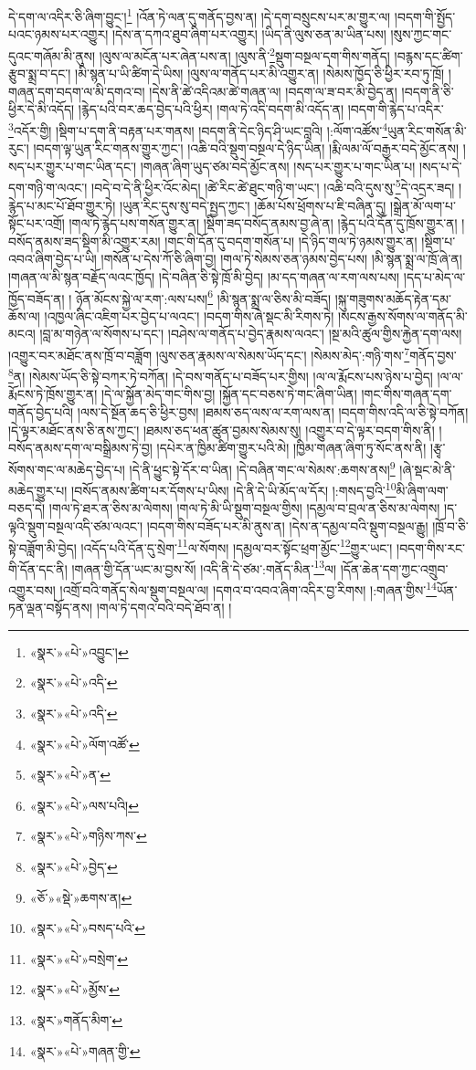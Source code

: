 དེ་དག་ལ་འདིར་ཅི་ཞིག་བྱུང་།\footnote{«སྣར་»«པེ་»འབྱུང་།} །འོན་ཏེ་ལན་དུ་གནོད་བྱས་ན། །དེ་དག་བསྲུངས་པར་མ་གྱུར་ལ། །བདག་གི་སྤྱོད་པའང་ཉམས་པར་འགྱུར། །དེས་ན་དཀའ་ཐུབ་ཞིག་པར་འགྱུར། །ཡིད་ནི་ལུས་ཅན་མ་ཡིན་པས། །སུས་ཀྱང་གང་དུའང་གཞོམ་མི་ནུས། །ལུས་ལ་མངོན་པར་ཞེན་པས་ན། །ལུས་ནི་\footnote{«སྣར་»«པེ་»འདི་}སྡུག་བསྔལ་དག་གིས་གནོད། །བརྙས་དང་ཚིག་རྩུབ་སྨྲ་བ་དང་། །མི་སྙན་པ་ཡི་ཚིག་དེ་ཡིས། །ལུས་ལ་གནོད་པར་མི་འགྱུར་ན། །སེམས་ཁྱོད་ཅི་ཕྱིར་རབ་ཏུ་ཁྲོ། །གཞན་དག་བདག་ལ་མི་དགའ་བ། །དེས་ནི་ཚེ་འདིའམ་ཚེ་གཞན་ལ། །བདག་ལ་ཟ་བར་མི་བྱེད་ན། །བདག་ནི་ཅི་ཕྱིར་དེ་མི་འདོད། །རྙེད་པའི་བར་ཆད་བྱེད་པའི་ཕྱིར། །གལ་ཏེ་འདི་བདག་མི་འདོད་ན། །བདག་གི་རྙེད་པ་འདིར་\footnote{«སྣར་»«པེ་»འདི་}འདོར་གྱི། །སྡིག་པ་དག་ནི་བརྟན་པར་གནས། །བདག་ནི་དེང་ཉིད་ཤི་ཡང་བླའི། །:ལོག་འཚོས་\footnote{«སྣར་»«པེ་»ལོག་འཚོ་}ཡུན་རིང་གསོན་མི་རུང་། །བདག་ལྟ་ཡུན་རིང་གནས་གྱུར་ཀྱང་། །འཆི་བའི་སྡུག་བསྔལ་དེ་ཉིད་ཡིན། །རྨི་ལམ་ལོ་བརྒྱར་བདེ་མྱོང་ནས། །སད་པར་གྱུར་པ་གང་ཡིན་དང་། །གཞན་ཞིག་ཡུད་ཙམ་བདེ་མྱོང་ནས། །སད་པར་གྱུར་པ་གང་ཡིན་པ། །སད་པ་དེ་དག་གཉི་ག་ལའང་། །བདེ་བ་དེ་ནི་ཕྱིར་འོང་མེད། །ཚེ་རིང་ཚེ་ཐུང་གཉི་ག་ཡང་། །འཆི་བའི་དུས་སུ་\footnote{«སྣར་»«པེ་»ན་}དེ་འདྲར་ཟད། །རྙེད་པ་མང་པོ་ཐོབ་གྱུར་ཏེ། །ཡུན་རིང་དུས་སུ་བདེ་སྤྱད་ཀྱང་། །ཆོམ་པོས་ཕྲོགས་པ་ཇི་བཞིན་དུ། །སྒྲེན་མོ་ལག་པ་སྟོང་པར་འགྲོ། །གལ་ཏེ་རྙེད་པས་གསོན་གྱུར་ན། །སྡིག་ཟད་བསོད་ནམས་བྱ་ཞེ་ན། །རྙེད་པའི་དོན་དུ་ཁྲོས་གྱུར་ན། །བསོད་ནམས་ཟད་སྡིག་མི་འགྱུར་རམ། །གང་གི་དོན་དུ་བདག་གསོན་པ། །དེ་ཉིད་གལ་ཏེ་ཉམས་གྱུར་ན། །སྡིག་པ་འབའ་ཞིག་བྱེད་པ་ཡི། །གསོན་པ་དེས་ཀོ་ཅི་ཞིག་བྱ། །གལ་ཏེ་སེམས་ཅན་ཉམས་བྱེད་པས། །མི་སྙན་སྨྲ་ལ་ཁྲོ་ཞེ་ན། །གཞན་ལ་མི་སྙན་བརྗོད་ལའང་ཁྱོད། །དེ་བཞིན་ཅི་སྟེ་ཁྲོ་མི་བྱེད། །མ་དད་གཞན་ལ་རག་ལས་པས། །དད་པ་མེད་ལ་ཁྱོད་བཟོད་ན། །
ཉོན་མོངས་སྐྱེ་ལ་རག་:ལས་པས།\footnote{«སྣར་»«པེ་»ལས་པའི།} །མི་སྙན་སྨྲ་ལ་ཅིས་མི་བཟོད། །སྐུ་གཟུགས་མཆོད་རྟེན་དམ་ཆོས་ལ། །འཁྱལ་ཞིང་འཇིག་པར་བྱེད་པ་ལའང་། །བདག་གིས་ཞེ་སྡང་མི་རིགས་ཏེ། །སངས་རྒྱས་སོགས་ལ་གནོད་མི་མངའ། །བླ་མ་གཉེན་ལ་སོགས་པ་དང་། །བཤེས་ལ་གནོད་པ་བྱེད་རྣམས་ལའང་། །སྔ་མའི་ཚུལ་གྱིས་རྐྱེན་དག་ལས། །འགྱུར་བར་མཐོང་ནས་ཁྲོ་བ་བཟློག །ལུས་ཅན་རྣམས་ལ་སེམས་ཡོད་དང་། །སེམས་མེད་:གཉི་གས་\footnote{«སྣར་»«པེ་»གཉིས་ཀས་}གནོད་བྱས་\footnote{«སྣར་»«པེ་»བྱེད་}ན། །སེམས་ཡོད་ཅི་སྟེ་བཀར་ཏེ་བཀོན། །དེ་བས་གནོད་པ་བཟོད་པར་གྱིས། །ལ་ལ་རྨོངས་པས་ཉེས་པ་བྱེད། །ལ་ལ་རྨོངས་ཏེ་ཁྲོས་གྱུར་ན། །དེ་ལ་སྐྱོན་མེད་གང་གིས་བྱ། །སྐྱོན་དང་བཅས་ཏེ་གང་ཞིག་ཡིན། །གང་གིས་གཞན་དག་གནོད་བྱེད་པའི། །ལས་དེ་སྔོན་ཆད་ཅི་ཕྱིར་བྱས། །ཐམས་ཅད་ལས་ལ་རག་ལས་ན། །བདག་གིས་འདི་ལ་ཅི་སྟེ་བཀོན། །དེ་ལྟར་མཐོང་ནས་ཅི་ནས་ཀྱང་། །ཐམས་ཅད་ཕན་ཚུན་བྱམས་སེམས་སུ། །འགྱུར་བ་དེ་ལྟར་བདག་གིས་ནི། །བསོད་ནམས་དག་ལ་བསྒྲིམས་ཏེ་བྱ། །དཔེར་ན་ཁྱིམ་ཚིག་གྱུར་པའི་མེ། །ཁྱིམ་གཞན་ཞིག་ཏུ་སོང་ནས་ནི། །རྩྭ་སོགས་གང་ལ་མཆེད་བྱེད་པ། །དེ་ནི་ཕྱུང་སྟེ་དོར་བ་ཡིན། །དེ་བཞིན་གང་ལ་སེམས་:ཆགས་ནས།\footnote{«ཅོ་»«སྡེ་»ཆགས་ན།} །ཞེ་སྡང་མེ་ནི་མཆེད་གྱུར་པ། །བསོད་ནམས་ཚིག་པར་དོགས་པ་ཡིས། །དེ་ནི་དེ་ཡི་མོད་ལ་དོར། །:གསད་བྱའི་\footnote{«སྣར་»«པེ་»བསད་པའི་}མི་ཞིག་ལག་བཅད་དེ། །གལ་ཏེ་ཐར་ན་ཅིས་མ་ལེགས། །གལ་ཏེ་མི་ཡི་སྡུག་བསྔལ་གྱིས། །དམྱལ་བ་བྲལ་ན་ཅིས་མ་ལེགས། །ད་ལྟའི་སྡུག་བསྔལ་འདི་ཙམ་ལའང་། །བདག་གིས་བཟོད་པར་མི་ནུས་ན། །དེས་ན་དམྱལ་བའི་སྡུག་བསྔལ་རྒྱུ། །ཁྲོ་བ་ཅི་སྟེ་བཟློག་མི་བྱེད། །འདོད་པའི་དོན་དུ་སྲེག་\footnote{«སྣར་»«པེ་»བསྲེག་}ལ་སོགས། །དམྱལ་བར་སྟོང་ཕྲག་མྱོང་\footnote{«སྣར་»«པེ་»མྱོས་}གྱུར་ཡང་། །བདག་གིས་རང་གི་དོན་དང་ནི། །གཞན་གྱི་དོན་ཡང་མ་བྱས་སོ། །འདི་ནི་དེ་ཙམ་:གནོད་མིན་\footnote{«སྣར་»གནོད་མིག་}ལ། །དོན་ཆེན་དག་ཀྱང་འགྲུབ་འགྱུར་བས། །འགྲོ་བའི་གནོད་སེལ་སྡུག་བསྔལ་ལ། །དགའ་བ་འབའ་ཞིག་འདིར་བྱ་རིགས། །:གཞན་གྱིས་\footnote{«སྣར་»«པེ་»གཞན་གྱི་}ཡོན་ཏན་ལྡན་བསྟོད་ནས། །གལ་ཏེ་དགའ་བའི་བདེ་ཐོབ་ན། །
